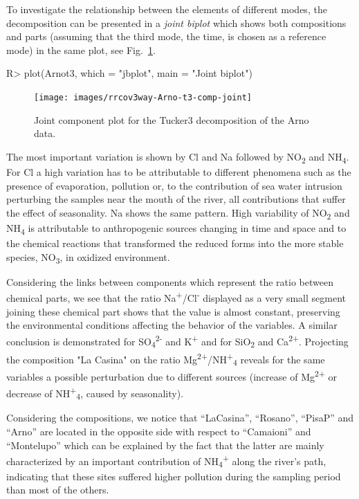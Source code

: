 \documentclass[article,shortnames, nojss]{jss}
\begin{document}
To investigate the relationship between the
elements of different modes, the decomposition can be presented in
a \emph{joint biplot} which shows both compositions and parts (assuming
that the third mode, the time, is chosen as a reference mode) in the same
plot, see Fig.~\ref{fig-Arno-t3-comp-joint}.

\begin{Schunk}
\begin{Sinput}
R> plot(Arnot3, which = "jbplot", main = "Joint biplot")
\end{Sinput}
\end{Schunk}
\begin{figure}[H]
\centering
\texttt{[image: images/rrcov3way-Arno-t3-comp-joint]}
\caption{Joint component plot for the Tucker3 decomposition of the Arno data.}
\label{fig-Arno-t3-comp-joint}
\end{figure}

The most important variation is shown by Cl and Na followed by
NO\textsubscript{2} and NH\textsubscript{4}. For Cl a high variation has to be attributable to
different phenomena such as the presence of evaporation, pollution or, to the
contribution of sea water intrusion perturbing the samples near the mouth of the river, all
contributions that suffer the effect of seasonality. Na shows the same pattern.
High variability of NO\textsubscript{2} and NH\textsubscript{4} is
attributable to anthropogenic sources changing in time and space and
to the chemical reactions that transformed the reduced forms into
the more stable species, NO\textsubscript{3}, in oxidized environment.

Considering the links between components which represent the ratio
between chemical parts, we see that the ratio Na\textsuperscript{+}/Cl\textsuperscript{-}
displayed as a very small segment joining these chemical part shows
that the value is almost constant, preserving the environmental conditions
affecting the behavior of the variables.
A similar conclusion is demonstrated for SO\textsubscript{4}\textsuperscript{2-} and
K\textsuperscript{+} and for SiO\textsubscript{2} and Ca\textsuperscript{2+}.
Projecting the composition "La Casina" on the ratio
Mg\textsuperscript{2+}/NH\textsuperscript{+}\textsubscript{4} reveals
for the same variables a possible perturbation due to different
sources (increase of Mg\textsuperscript{2+} or decrease of
NH\textsuperscript{+}\textsubscript{4}, caused by seasonality).

Considering the compositions, we notice that ``LaCasina'', ``Rosano'', ``PisaP'' and ``Arno''
are located in the opposite side with respect  to ``Camaioni'' and ``Montelupo''
which can be explained by the fact that the latter are mainly characterized
by an important contribution of NH\textsubscript{4}\textsuperscript{+}
along the river's path, indicating that these sites suffered higher
pollution during the sampling period than most of the others.
\end{document}

